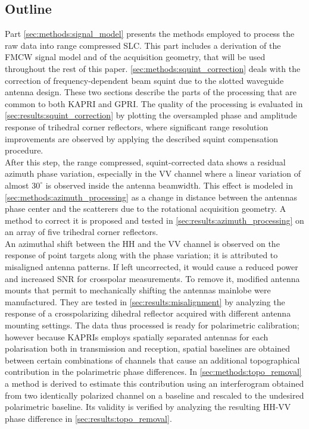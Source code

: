\subsection{Outline}
Part \ref{sec:methods:signal_model} presents  the methods employed to process the raw data into range compressed SLC. This part includes a derivation of the FMCW signal model and of the acquisition geometry, that will be used throughout the rest of this paper. \autoref{sec:methods:squint_correction} deals with the correction of frequency-dependent beam squint due to the slotted waveguide antenna design. These two sections describe the parts of the processing that are common to both KAPRI and GPRI. The quality of the processing is evaluated in \autoref{sec:results:squint_correction} by plotting the oversampled phase and amplitude response of trihedral corner reflectors, where significant range resolution improvements are observed by applying the described squint compensation procedure.\\
After this step, the range compressed, squint-corrected data shows a residual azimuth phase variation, especially in the VV channel where a linear variation of almost $30^\circ$ is observed inside the antenna beamwidth. This effect is modeled in \autoref{sec:methods:azimuth_processing} as a change in distance between the antennas phase center and the scatterers due to the rotational acquisition geometry. A method to correct it is proposed and tested in \autoref{sec:results:azimuth_processing} on an array of five trihedral corner reflectors.\\ An azimuthal shift between the HH and the VV channel is observed on the  response of point targets along with the phase variation; it is attributed to misaligned antenna patterns. If left uncorrected, it would cause a reduced power and increased SNR for crosspolar measurements. To remove it, modified antenna mounts that permit to mechanically shifting the antennas mainlobe were manufactured. They are tested in \autoref{sec:results:misalignment} by analyzing the response of a crosspolarizing dihedral reflector acquired with different antenna mounting settings.
The data thus processed is ready for polarimetric calibration; however because KAPRIs employs spatially separated antennas for each polarisation both in transmission and reception, spatial baselines are obtained between certain combinations of channels that cause an additional topographical contribution in the polarimetric phase differences. In \autoref{sec:methods:topo_removal} a method is derived to estimate this contribution using an interferogram obtained from two identically polarized channel on a baseline and rescaled to the undesired polarimetric baseline. Its validity is verified by analyzing the resulting HH-VV phase difference in \autoref{sec:results:topo_removal}.\\
